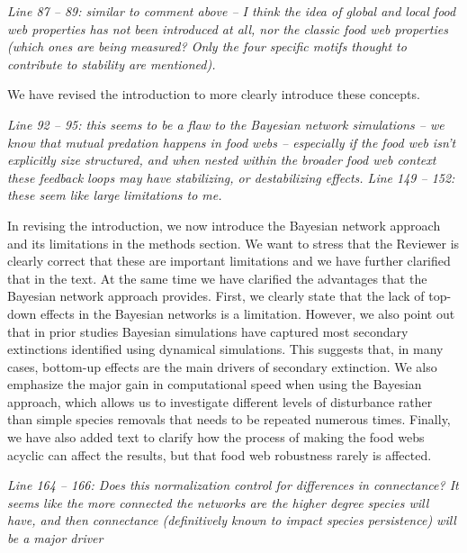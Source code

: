 \documentclass[12pt]{article}
\newcommand{\us}{\rm \setlength{\leftskip}{0.3cm} \setlength{\rightskip}{0.3cm}}
\newcommand{\them}{\it \setlength{\leftskip}{0cm} \setlength{\rightskip}{0cm}}
\begin{document}
        
        
        \them
        Line 87 – 89: similar to comment above – I think the idea of global and local food web properties has not been introduced at all, nor the classic food web properties (which ones are being measured? Only the four specific motifs thought to contribute to stability are mentioned).
        
        \us We have revised the introduction to more clearly introduce these concepts. 
        
        \them
        Line 92 – 95: this seems to be a flaw to the Bayesian network simulations – we know that mutual predation happens in food webs – especially if the food web isn’t explicitly size structured, and when nested within the broader food web context these feedback loops may have stabilizing, or destabilizing effects.
        \smallskip
        Line 149 – 152: these seem like large limitations to me.
        
        
        \us In revising the introduction, we now introduce the Bayesian network approach and its limitations in the methods section. We want to stress that the Reviewer is clearly correct that these are important limitations and we have further clarified that in the text. At the same time we have clarified the advantages that the Bayesian network approach provides.
        First, we clearly state that the lack of top-down effects in the Bayesian networks is a limitation. However, we also point out that in prior studies Bayesian simulations have captured most secondary extinctions identified using dynamical simulations. This suggests that, in many cases, bottom-up effects are the main drivers of secondary extinction. We also emphasize the major gain in computational speed when using the Bayesian approach, which allows us to investigate different levels of disturbance rather than simple species removals that needs to be repeated numerous times. Finally, we have also added text to clarify how the process of making the food webs acyclic can affect the results, but that food web robustness rarely is affected.  
        
        \them
        Line 164 – 166: Does this normalization control for differences in connectance? It seems like the more connected the networks are the higher degree species will have, and then connectance (definitively known to impact species persistence) will be a major driver
        
\end{document}
